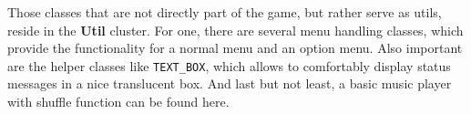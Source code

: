 Those classes that are not directly part of the game, but rather serve as utils, reside in the \textbf{Util} cluster. For one, there are several menu handling classes, which provide the functionality for a normal menu and an option menu. Also important are the helper classes like \texttt{TEXT\_BOX}, which allows to comfortably display status messages in a nice translucent box. And last but not least, a basic music player with shuffle function can be found here.
